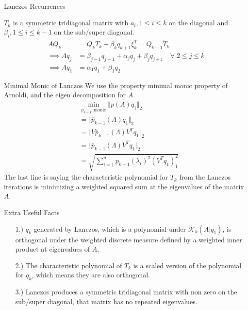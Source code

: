 \documentclass{beamer}
\begin{document}
    \begin{frame}{Lanczos Recurrences}
        \begin{theorem}
            $T_k$ is a symmetric tridiagonal matrix with $a_i, 1\le i\le k$ on the diagonal and $\beta_i, 1 \le i \le k -1$ on the sub/super diagonal. 
            \begin{align}
                AQ_k &= Q_kT_k + \beta_k q_{k + 1}\xi_k^T = Q_{k + 1}\tilde{T}_k
                \\
                \implies Aq_j
                &= \beta_{j - 1}q_{j - 1} + \alpha_j q_j + \beta_{j}q_{j + 1} \quad \forall\; 2\le j\le k
                \\
                \implies Aq_1 &= \alpha_1q_1 + \beta_1 q_2
            \end{align}    
        \end{theorem}
    \end{frame}
    \begin{frame}{Minimal Monic of Lanczos}
        We use the property minimal monic property of Arnoldi, and the eigen decomposition for $A$. 
         \begin{align}
                & \min_{p_{k - 1}:\text{monic}} \Vert p(A)q_1\Vert_2
                \\
                & =\Vert \overline{p}_{k - 1}(A)q_1\Vert_2
                \\
                & = \Vert V \bar{p}_{k - 1}(\Lambda)V^Tq_1\Vert_2
                \\
                & = \Vert \bar{p}_{k - 1}(\Lambda)V^Tq_1\Vert_2
                \\
                &= \sqrt{
                    \sum_{i = 1}^n p_{k - 1}(\lambda_i)^2(V^Tq_1)^2_1
                }
            \end{align}
            The last line is saying the characteristic polynomial for $T_k$ from the Lanczos iterations is minimizing a weighted squared sum at the eigenvalues of the matrix $A$. 
    \end{frame}
    \begin{frame}{Extra Useful Facts}
        \begin{itemize}
            \item [1.)] $q_k$ generated by Lanczos, which is a polynomial under $\mathcal K_k(A|q_1)$, is orthogonal under the weighted discrete measure defined by a weighted inner product at eigenvalues of $A$. 
            \item [2.)] The characteristic polynomial of $T_k$ is a scaled version of the polynomial for $q_k$, which means they are also orthogonal. 
            \item [3.)] Lanczos produces a symmetric tridiagonal matrix with non zero on the sub/super diagonal, that matrix has no repeated eigenvalues. 
        \end{itemize}
    \end{frame}
\end{document}
